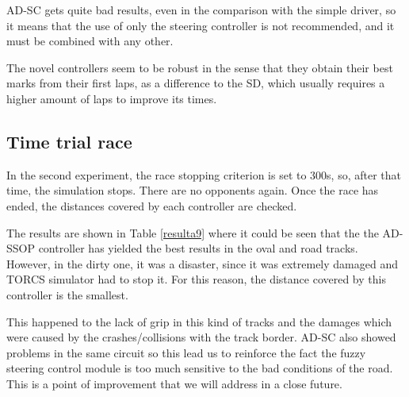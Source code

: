 \documentclass[runningheads,a4paper]{llncs}
\begin{document}
	AD-SC gets quite bad results, even in the comparison with the simple driver, so it means that the use of only the steering controller is not recommended, and it must be combined with any other. 
	
	The novel controllers seem to be robust in the sense that they obtain their best marks from their first laps, as a difference to the SD, which usually requires a higher amount of laps to improve its times.
	
	
	\subsection{Time trial race}
	
	In the second experiment, the race stopping criterion is set to 300s, so, after that time, the simulation stops. There are no opponents again.
	Once the race has ended, the distances covered by each controller are checked.
	
	The results are shown in Table \ref{resulta9} where it could be seen that the the AD-SSOP controller has yielded the best results in the oval and road tracks. However, in the dirty one, it was a disaster, since it was extremely damaged and TORCS simulator had to stop it. For this reason, the distance covered by this controller is the smallest. 
	
	This happened to the lack of grip in this kind of tracks and the damages which were caused by the crashes/collisions with the track border. 
	AD-SC also showed problems in the same circuit so this lead us to reinforce the fact the fuzzy steering control module is too much sensitive to the bad conditions of the road. This is a point of improvement that we will address in a close future.
	
\end{document}

